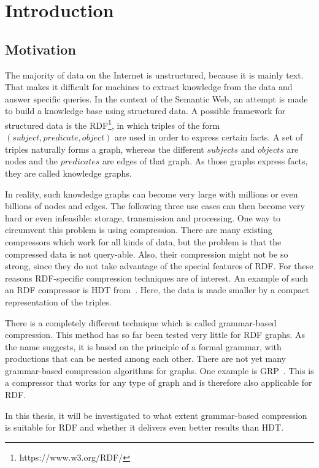\chapter{Introduction}\label{ch:introduction}

\section{Motivation}
The majority of data on the Internet is unstructured, because it is mainly text. That makes it difficult for machines to extract knowledge from the data and answer specific queries. In the context of the Semantic Web, an attempt is made to build a knowledge base using structured data. A possible framework for structured data is the \ac{RDF}\footnote{https://www.w3.org/RDF/}, in which triples of the form $ (subject, predicate, object) $ are used in order to express certain facts. A set of triples naturally forms a graph, whereas the different $subjects$ and $objects$ are nodes and the $predicates$ are edges of that graph. As those graphs express facts, they are called knowledge graphs.

In reality, such knowledge graphs can become very large with millions or even billions of nodes and edges. The following three use cases can then become very hard or even infeasible: storage, transmission and processing. One way to circumvent this problem is using compression. There are many existing compressors which work for all kinds of data, but the problem is that the compressed data is not query-able. Also, their compression might not be so strong, since they do not take advantage of the special features of RDF. For these reasons RDF-specific compression techniques are of interest. An example of such an RDF compressor is \ac{HDT} from~\cite{hdt}. Here, the data is made smaller by a compact representation of the triples. 

There is a completely different technique which is called grammar-based compression. This method has so far been tested very little for RDF graphs. As the name suggests, it is based on the principle of a formal grammar, with productions that can be nested among each other. There are not yet many grammar-based compression algorithms for graphs. One example is \ac{GRP}~\cite{maneth}. This is a compressor that works for any type of graph and is therefore also applicable for RDF.

In this thesis, it will be investigated to what extent grammar-based compression is suitable for RDF and whether it delivers even better results than HDT.

